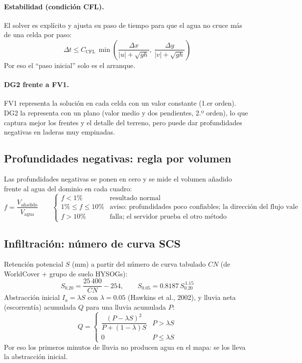 \documentclass[11pt,letterpaper]{article}
\begin{document}
\paragraph{Estabilidad (condición CFL).} El solver es explícito y ajusta su paso de tiempo para que el agua no cruce más de una celda por paso:
\begin{equation}
\Delta t \le C_{\text{CFL}}\,\min\!\left(\frac{\Delta x}{|u|+\sqrt{gh}},\ \frac{\Delta y}{|v|+\sqrt{gh}}\right)
\end{equation}
Por eso el ``paso inicial'' solo es el arranque.

\paragraph{DG2 frente a FV1.} FV1 representa la solución en cada celda con un valor constante (1.er orden). DG2 la representa con un plano (valor medio y dos pendientes, 2.º orden), lo que captura mejor los frentes y el detalle del terreno, pero puede dar profundidades negativas en laderas muy empinadas.

\subsection{Profundidades negativas: regla por volumen}
Las profundidades negativas se ponen en cero y se mide el volumen añadido frente al agua del dominio en cada cuadro:
\begin{equation}
f=\frac{V_{\text{añadido}}}{V_{\text{agua}}}\qquad
\begin{cases}
f<1\% & \text{resultado normal}\\
1\%\le f\le 10\% & \text{aviso: profundidades poco confiables; la dirección del flujo vale}\\
f>10\% & \text{falla; el servidor prueba el otro método}
\end{cases}
\end{equation}

\subsection{Infiltración: número de curva SCS}
Retención potencial $S$ (mm) a partir del número de curva tabulado $CN$ (de WorldCover + grupo de suelo HYSOGs):
\begin{equation}
S_{0.20}=\frac{25\,400}{CN}-254,\qquad S_{0.05}=0.8187\,S_{0.20}^{\,1.15}
\end{equation}
Abstracción inicial $I_a=\lambda S$ con $\lambda=0.05$ (Hawkins et al., 2002), y lluvia neta (escorrentía) acumulada $Q$ para una lluvia acumulada $P$:
\begin{equation}
Q=\begin{cases}\dfrac{(P-\lambda S)^2}{P+(1-\lambda)S} & P>\lambda S\\[6pt] 0 & P\le \lambda S\end{cases}
\end{equation}
Por eso los primeros minutos de lluvia no producen agua en el mapa: se los lleva la abstracción inicial.
\end{document}
